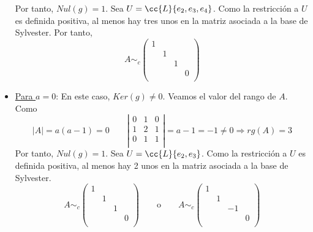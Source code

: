 \begin{ejercicio}
\begin{itemize}
        Por tanto, $Nul(g)=1$. Sea $U=\cc{L}\{e_2, e_3,e_4\}$. Como la restricción a $U$ es definida positiva, al menos hay tres unos en la matriz asociada a la base de Sylvester. Por tanto,
        \begin{equation*}
            A\sim_c\left(\begin{array}{cccc}
                 1&&&  \\
                 &1&& \\
                 &&1& \\
                 &&&0 \\
            \end{array}\right)
        \end{equation*}

        \item \underline{Para $a=0$}:
        En este caso, $Ker(g)\neq 0$. Veamos el valor del rango de $A$. Como
        \begin{equation*}
            |A|=a(a-1) = 0
            \qquad
            \left|\begin{array}{ccc}
                0 & 1 & 0 \\
                1 & 2 & 1 \\
                0 & 1 & 1 \\
            \end{array} \right|=a-1=-1 \neq 0\Longrightarrow rg(A)=3
        \end{equation*}
        Por tanto, $Nul(g)=1$. Sea $U=\cc{L}\{e_2, e_3\}$.
        Como la restricción a $U$ es definida positiva, al menos hay 2 unos en la matriz asociada a la base de Sylvester.
        \begin{equation*}
            A\sim_c\left(\begin{array}{cccc}
                 1&&&  \\
                 &1&& \\
                 &&1& \\
                 &&&0 \\
            \end{array}\right)
            \qquad \text{o} \qquad
            A\sim_c\left(\begin{array}{cccc}
                 1&&&  \\
                 &1&& \\
                 &&-1& \\
                 &&&0 \\
            \end{array}\right)
        \end{equation*}


\end{itemize}
\end{ejercicio}
